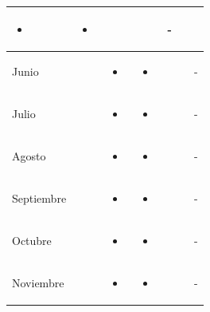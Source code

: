 \documentclass[landscape, a4paper, 10pt]{article}
\newcommand{\smallcellwidth}{0.7in}
\newcommand{\normalcellwidth}{1.2in}
\newcommand{\bigcellwidth}{2.0in}
\begin{document}
\begin{longtable}{|m{\smallcellwidth}|p{\normalcellwidth}|p{\bigcellwidth}|p{\bigcellwidth}|p{\normalcellwidth}|p{\normalcellwidth}|p{\normalcellwidth}|}
\begin{itemize}
			\item 
		\end{itemize} &
		\begin{itemize}
			\item 
		\end{itemize} &
		  &
		  &
		 - \\
		\hline
		Junio &
		 &
		\begin{itemize}
			\item 
		\end{itemize} &
		\begin{itemize}
			\item 
		\end{itemize} &
		  &
		  &
		 - \\
		\hline
		Julio &
		 &
		\begin{itemize}
			\item 
		\end{itemize} &
		\begin{itemize}
			\item 
		\end{itemize} &
		  &
		  &
		 - \\
		\hline
		Agosto &
		 &
		\begin{itemize}
			\item 
		\end{itemize} &
		\begin{itemize}
			\item 
		\end{itemize} &
		  &
		  &
		 - \\
		\hline
		Septiembre &
		 &
		\begin{itemize}
			\item 
		\end{itemize} &
		\begin{itemize}
			\item 
		\end{itemize} &
		  &
		  &
		 - \\
		\hline
		Octubre &
		 &
		\begin{itemize}
			\item 
		\end{itemize} &
		\begin{itemize}
			\item 
		\end{itemize} &
		  &
		  &
		 - \\
		\hline
		Noviembre &
		 &
		\begin{itemize}
			\item 
		\end{itemize} &
		\begin{itemize}
			\item 
		\end{itemize} &
		  &
		  &
		 - \\
		\hline

	\end{longtable}
\end{document}
